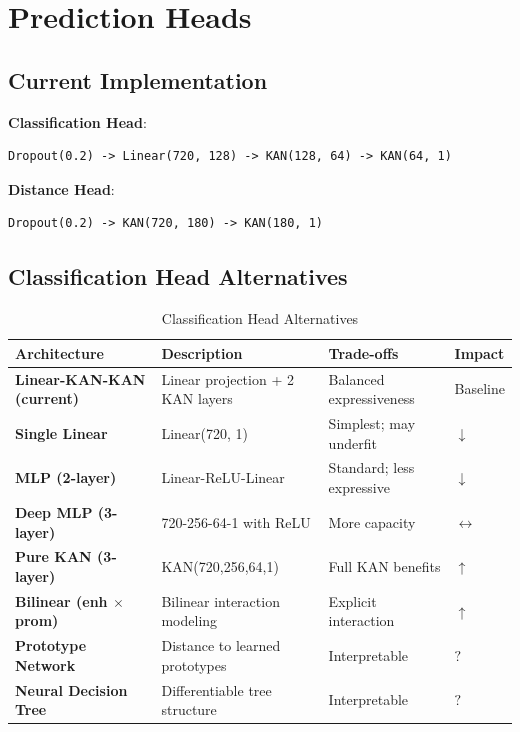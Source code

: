 \documentclass[11pt,a4paper]{article}
\begin{document}
\section{Prediction Heads}

\subsection{Current Implementation}

\textbf{Classification Head}:
\begin{verbatim}
Dropout(0.2) -> Linear(720, 128) -> KAN(128, 64) -> KAN(64, 1)
\end{verbatim}

\textbf{Distance Head}:
\begin{verbatim}
Dropout(0.2) -> KAN(720, 180) -> KAN(180, 1)
\end{verbatim}

\subsection{Classification Head Alternatives}

\begin{longtable}{L{3cm}L{4cm}L{4cm}C{1.5cm}}
\caption{Classification Head Alternatives} \\
\toprule
\textbf{Architecture} & \textbf{Description} & \textbf{Trade-offs} & \textbf{Impact} \\
\midrule
\endfirsthead
\bottomrule
\endlastfoot

\textbf{Linear-KAN-KAN (current)} & Linear projection + 2 KAN layers & Balanced expressiveness & Baseline \\

\textbf{Single Linear} & Linear(720, 1) & Simplest; may underfit & \textcolor{negative}{$\downarrow$} \\

\textbf{MLP (2-layer)} & Linear-ReLU-Linear & Standard; less expressive & \textcolor{negative}{$\downarrow$} \\

\textbf{Deep MLP (3-layer)} & 720-256-64-1 with ReLU & More capacity & \textcolor{neutral}{$\leftrightarrow$} \\

\textbf{Pure KAN (3-layer)} & KAN(720,256,64,1) & Full KAN benefits & \textcolor{positive}{$\uparrow$} \\

\textbf{Bilinear (enh $\times$ prom)} & Bilinear interaction modeling & Explicit interaction & \textcolor{positive}{$\uparrow$} \\

\textbf{Prototype Network} & Distance to learned prototypes & Interpretable & \textcolor{uncertain}{$?$} \\

\textbf{Neural Decision Tree} & Differentiable tree structure & Interpretable & \textcolor{uncertain}{$?$} \\

\end{longtable}
\end{document}
